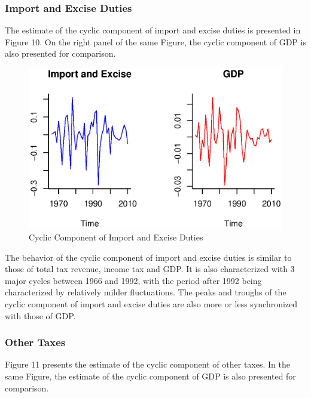 \documentclass[12pt,a4paper,final]{article}
\begin{document}
\subsubsection{Import and Excise Duties}

The estimate of the cyclic component of import and excise duties is presented in Figure 10. On the right panel of the same Figure, the cyclic component of GDP is also presented for comparison.

\begin{figure}[ht]
\centering
\begin{small}
\caption{Cyclic Component of Import and Excise Duties}
\end{small}
\includegraphics[scale=0.601]{import_taxes.eps} 
\end{figure}

The behavior of the cyclic component of import and excise duties is similar to those of total tax revenue, income tax and GDP. It is also characterized with 3 major cycles between 1966 and 1992, with the period after 1992 being characterized by relatively milder fluctuations.  The peaks and troughs of the cyclic component of import and excise duties are also more or less synchronized with those of GDP.

\subsubsection{Other Taxes}

Figure 11 presents the estimate of the cyclic component of other taxes. In the same Figure, the estimate of the cyclic component of GDP is also presented for comparison.
\end{document}
